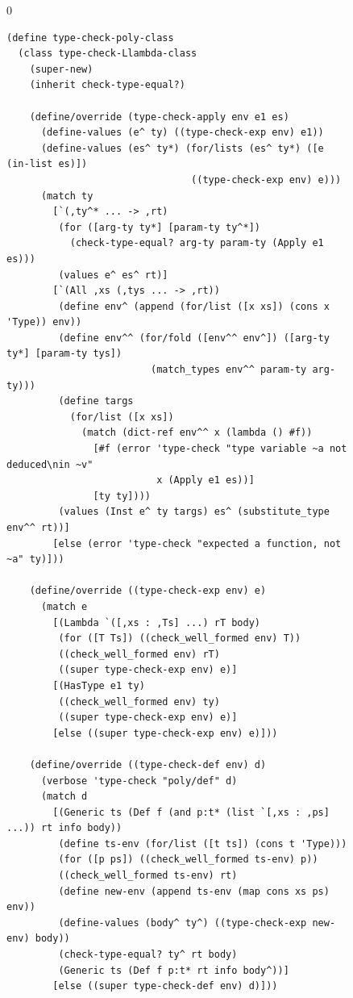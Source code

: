 \documentclass[7x10]{TimesAPriori_MIT}%
\def\racketEd{0}
\def\edition{0}
\numberwithin{theorem}{chapter}
\numberwithin{definition}{chapter}
\numberwithin{equation}{chapter}
\begin{document}
\begin{figure}[tbp]
  \begin{tcolorbox}[colback=white]
\if\edition\racketEd    
\begin{lstlisting}[basicstyle=\ttfamily\scriptsize]
(define type-check-poly-class
  (class type-check-Llambda-class
    (super-new)
    (inherit check-type-equal?)
  
    (define/override (type-check-apply env e1 es)
      (define-values (e^ ty) ((type-check-exp env) e1))
      (define-values (es^ ty*) (for/lists (es^ ty*) ([e (in-list es)])
                                ((type-check-exp env) e)))
      (match ty
        [`(,ty^* ... -> ,rt)
         (for ([arg-ty ty*] [param-ty ty^*])
           (check-type-equal? arg-ty param-ty (Apply e1 es)))
         (values e^ es^ rt)]
        [`(All ,xs (,tys ... -> ,rt))
         (define env^ (append (for/list ([x xs]) (cons x 'Type)) env))
         (define env^^ (for/fold ([env^^ env^]) ([arg-ty ty*] [param-ty tys])
                         (match_types env^^ param-ty arg-ty)))
         (define targs
           (for/list ([x xs])
             (match (dict-ref env^^ x (lambda () #f))
               [#f (error 'type-check "type variable ~a not deduced\nin ~v"
                          x (Apply e1 es))]
               [ty ty])))
         (values (Inst e^ ty targs) es^ (substitute_type env^^ rt))]
        [else (error 'type-check "expected a function, not ~a" ty)]))
    
    (define/override ((type-check-exp env) e)
      (match e
        [(Lambda `([,xs : ,Ts] ...) rT body)
         (for ([T Ts]) ((check_well_formed env) T))
         ((check_well_formed env) rT)
         ((super type-check-exp env) e)]
        [(HasType e1 ty)
         ((check_well_formed env) ty)
         ((super type-check-exp env) e)]
        [else ((super type-check-exp env) e)]))

    (define/override ((type-check-def env) d)
      (verbose 'type-check "poly/def" d)
      (match d
        [(Generic ts (Def f (and p:t* (list `[,xs : ,ps] ...)) rt info body))
         (define ts-env (for/list ([t ts]) (cons t 'Type)))
         (for ([p ps]) ((check_well_formed ts-env) p))
         ((check_well_formed ts-env) rt)
         (define new-env (append ts-env (map cons xs ps) env))
         (define-values (body^ ty^) ((type-check-exp new-env) body))
         (check-type-equal? ty^ rt body)
         (Generic ts (Def f p:t* rt info body^))]
        [else ((super type-check-def env) d)]))


\end{lstlisting}
\end{tcolorbox}
\end{figure}
\end{document}

